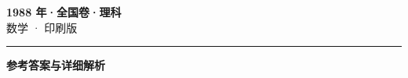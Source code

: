 \documentclass[zihao=5, a4paper]{ctexart}
\begin{document}
\begin{center}
  {\Large\bfseries 1988 年·全国卷·理科}\\[4pt]
  {\large 数学 · 印刷版}
\end{center}
\medskip
{}

\par\bigskip\hrule\bigskip
{}
\begin{center}{\large\bfseries 参考答案与详细解析}\end{center}
\smallskip

\end{document}
